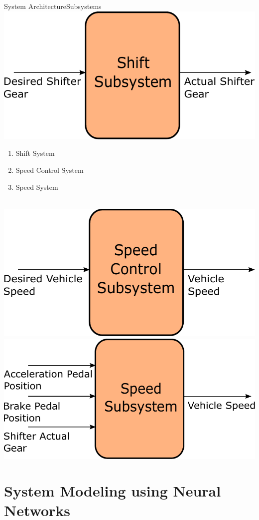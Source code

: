\documentclass{beamer}
\begin{document}
\begin{frame}{System Architecture}{Subsystems}
	\centering \includegraphics[width=.45\linewidth]{figs/inkscape/shiftModelArchitecture}\quad%
	\centering \begin{minipage}[b][0.4\textheight][c]{.45\linewidth} \begin{enumerate} \item Shift System \item 		Speed Control System \item Speed System \end{enumerate} \end{minipage}\\[1em]
	\centering \includegraphics[width=.45\linewidth]{figs/inkscape/speedControlModelArchitecture}\quad%
	\centering \includegraphics[width=.45\linewidth]{figs/inkscape/speedModelArchitecture}
\end{frame}

\section{System Modeling using Neural Networks}
\end{document}
